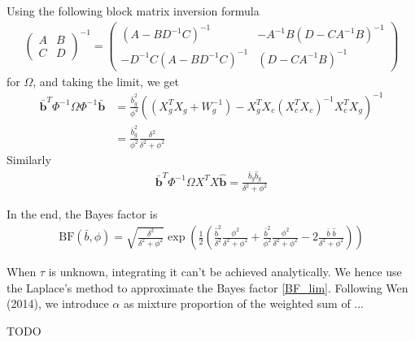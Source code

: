 \documentclass[10pt]{article}
\newcommand{\BF}{{\text{BF}}} %
\begin{document}
Using the following block matrix inversion formula
\begin{equation}
  \begin{aligned}
    \begin{pmatrix}
      A & B \\
      C & D
    \end{pmatrix}^{-1}
    =
    \begin{pmatrix}
      (A - B D^{-1} C)^{-1} & - A^{-1} B (D - C A^{-1} B)^{-1} \\
      - D^{-1} C (A - B D^{-1} C)^{-1} & (D - C A^{-1} B)^{-1}
    \end{pmatrix}
  \end{aligned}
\end{equation}
for $\Omega$, and taking the limit, we get
\begin{equation}
  \begin{aligned}
    \bar{\bm{b}}^T \Phi^{-1} \Omega \Phi^{-1} \bar{\bm{b}} &= \frac{\bar{b}_g^2}{\phi^4} ((X_g^T X_g + W_g^{-1}) - X_g^T X_c (X_c^T X_c)^{-1} X_c^T X_g)^{-1} \\
    &= \frac{\bar{b}_g^2}{\phi^2} \frac{\delta^2}{\delta^2 + \phi^2}
  \end{aligned}
\end{equation}
Similarly
\begin{equation}
  \begin{aligned}
    \bar{\bm{b}}^T \Phi^{-1} \Omega X^T X \hat{\bm{b}} = \frac{\bar{b}_g \hat{b}_g}{\delta^2 + \phi^2}
  \end{aligned}
\end{equation}

In the end, the Bayes factor is
\begin{equation}
  \begin{aligned}
    \BF(\bar{b}, \phi) = \sqrt{\frac{\delta^2}{\delta^2 + \phi^2}} \exp \left( \frac{1}{2} \left( \frac{\hat{b}^2}{\delta^2} \frac{\phi^2}{\delta^2 + \phi^2} + \frac{\bar{b}^2}{\phi^2} \frac{\phi^2}{\delta^2 + \phi^2} - 2 \frac{\bar{b} \; \hat{b}}{\delta^2 + \phi^2} \right) \right)
  \end{aligned}
\end{equation}

When $\tau$ is unknown, integrating it can't be achieved analytically.
We hence use the Laplace's method to approximate the Bayes factor \eqref{BF_lim}.
Following Wen (2014), we introduce $\alpha$ as mixture proportion of the weighted sum of ...

TODO


\end{document}
